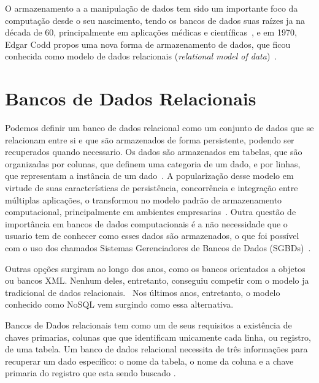 O armazenamento a a manipulação de dados tem sido um importante foco da computação desde o seu nascimento, tendo os bancos de dados suas raízes ja na década de 60, principalmente em aplicações médicas e científicas~\cite{neufeld1986database}, e em 1970, Edgar Codd propos uma nova forma de armazenamento de dados, que ficou conhecida como modelo de dados relacionais (\emph{relational model of data})~\cite{codd1970relational}. 

\section{Bancos de Dados Relacionais}
    Podemos definir um banco de dados relacional como um conjunto de dados que se relacionam entre si e que são armazenados de forma persistente, podendo ser recuperados quando necessario. Os dados são armazenados em tabelas, que são organizadas por colunas, que definem uma categoria de um dado, e por linhas, que representam a instância de um dado~\cite{leavitt2010nosql}. A popularização desse modelo em virtude de suas características de persistência, concorrência e integração entre múltiplas aplicações, o transformou no modelo padrão de armazenamento computacional, principalmente em ambientes empresarias~\cite{pramod}. Outra questão de importância em bancos de dados computacionais é a não necessidade que o usuario tem de conhecer como esses dados são armazenados, o que foi possível com o uso dos chamados Sistemas Gerenciadores de Bancos de Dados (SGBDs)~\cite{jan}.
    
    Outras opções surgiram ao longo dos anos, como os bancos orientados a objetos ou bancos XML. Nenhum deles, entretanto, conseguiu competir com o modelo ja tradicional de dados relacionais.~\cite{pramod} Nos últimos anos, entretanto, o modelo conhecido como NoSQL vem surgindo como essa alternativa.
    
    Bancos de Dados relacionais tem como um de seus requisitos a existência de chaves primarias, colunas que que identificam unicamente cada linha, ou registro, de uma tabela. Um banco de dados relacional necessita de três informações para recuperar um dado específico: o nome da tabela, o nome da coluna e a chave primaria do registro que esta sendo buscado \cite{jan}.

